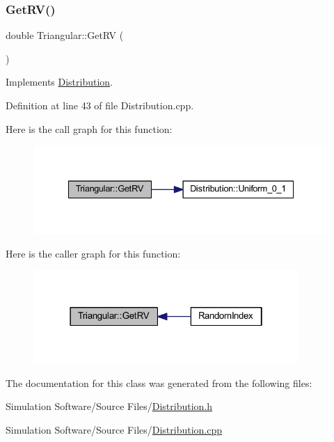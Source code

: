 \subsubsection{\texorpdfstring{Get\+R\+V()}{GetRV()}}
{\footnotesize\ttfamily double Triangular\+::\+Get\+RV (\begin{DoxyParamCaption}{ }\end{DoxyParamCaption})\hspace{0.3cm}{\ttfamily [virtual]}}



Implements \hyperlink{class_distribution_a63b433850d7b47d84eb69448f7916719}{Distribution}.



Definition at line 43 of file Distribution.\+cpp.

Here is the call graph for this function\+:
\nopagebreak
\begin{figure}[H]
\begin{center}
\leavevmode
\includegraphics[width=335pt]{class_triangular_aadd53c452801be8c0eb6ffb31a299835_cgraph}
\end{center}
\end{figure}
Here is the caller graph for this function\+:
\nopagebreak
\begin{figure}[H]
\begin{center}
\leavevmode
\includegraphics[width=286pt]{class_triangular_aadd53c452801be8c0eb6ffb31a299835_icgraph}
\end{center}
\end{figure}


The documentation for this class was generated from the following files\+:\begin{DoxyCompactItemize}
\item 
Simulation Software/\+Source Files/\hyperlink{_distribution_8h}{Distribution.\+h}\item 
Simulation Software/\+Source Files/\hyperlink{_distribution_8cpp}{Distribution.\+cpp}\end{DoxyCompactItemize}

